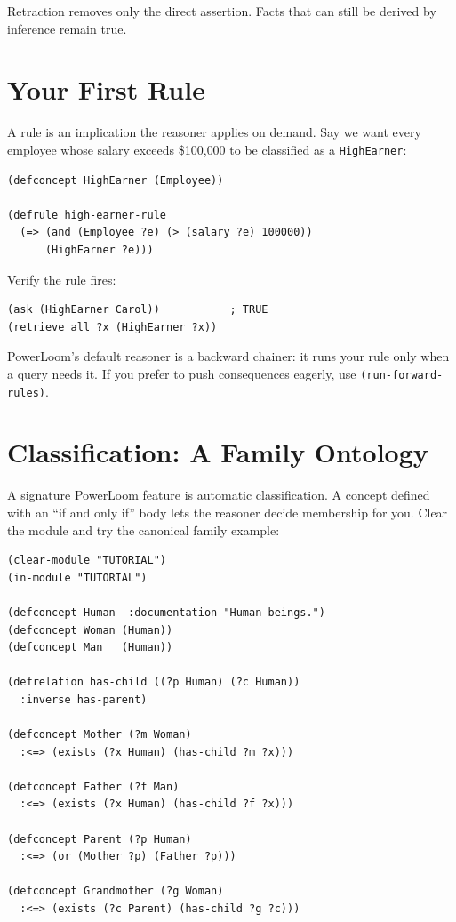 \documentclass[11pt,letterpaper]{article}
\newcommand{\cmd}[1]{\texttt{#1}}
\begin{document}
\noindent Retraction removes only the direct assertion. Facts that can still
be derived by inference remain true.

\section{Your First Rule}
\label{sec:rules}

A rule is an implication the reasoner applies on demand. Say we want every
employee whose salary exceeds \$100{,}000 to be classified as a
\cmd{HighEarner}:

\begin{lstlisting}
(defconcept HighEarner (Employee))

(defrule high-earner-rule
  (=> (and (Employee ?e) (> (salary ?e) 100000))
      (HighEarner ?e)))
\end{lstlisting}

\noindent Verify the rule fires:

\begin{lstlisting}
(ask (HighEarner Carol))           ; TRUE
(retrieve all ?x (HighEarner ?x))
\end{lstlisting}

\noindent PowerLoom's default reasoner is a backward chainer: it runs your
rule only when a query needs it. If you prefer to push consequences
eagerly, use \cmd{(run-forward-rules)}.

\section{Classification: A Family Ontology}
\label{sec:classify}

A signature PowerLoom feature is automatic classification. A concept
defined with an ``if and only if'' body lets the reasoner decide
membership for you. Clear the module and try the canonical family
example:

\begin{lstlisting}
(clear-module "TUTORIAL")
(in-module "TUTORIAL")

(defconcept Human  :documentation "Human beings.")
(defconcept Woman (Human))
(defconcept Man   (Human))

(defrelation has-child ((?p Human) (?c Human))
  :inverse has-parent)

(defconcept Mother (?m Woman)
  :<=> (exists (?x Human) (has-child ?m ?x)))

(defconcept Father (?f Man)
  :<=> (exists (?x Human) (has-child ?f ?x)))

(defconcept Parent (?p Human)
  :<=> (or (Mother ?p) (Father ?p)))

(defconcept Grandmother (?g Woman)
  :<=> (exists (?c Parent) (has-child ?g ?c)))
\end{lstlisting}
\end{document}
